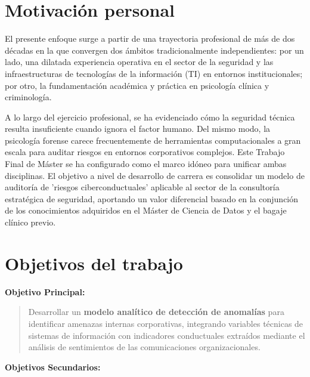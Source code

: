 \documentclass[IB]{TFUOC}%
\begin{document}
\section{Motivación personal}
El presente enfoque surge a partir de una trayectoria profesional de más de dos décadas en la que convergen dos ámbitos tradicionalmente independientes: por un lado, una dilatada experiencia operativa en el sector de la seguridad y las infraestructuras de tecnologías de la información (TI) en entornos institucionales; por otro, la fundamentación académica y práctica en psicología clínica y criminología.

\medskip
\noindent A lo largo del ejercicio profesional, se ha evidenciado cómo la seguridad técnica resulta insuficiente cuando ignora el factor humano. Del mismo modo, la psicología forense carece frecuentemente de herramientas computacionales a gran escala para auditar riesgos en entornos corporativos complejos. Este Trabajo Final de Máster se ha configurado como el marco idóneo para unificar ambas disciplinas. El objetivo a nivel de desarrollo de carrera es consolidar un modelo de auditoría de 'riesgos ciberconductuales' aplicable al sector de la consultoría estratégica de seguridad, aportando un valor diferencial basado en la conjunción de los conocimientos adquiridos en el Máster de Ciencia de Datos y el bagaje clínico previo.


\section{Objetivos del trabajo}

\textbf{Objetivo Principal:} 

\begin{quote}
Desarrollar un \textbf{modelo analítico de detección de anomalías} para identificar amenazas internas corporativas, integrando variables técnicas de sistemas de información con indicadores conductuales extraídos mediante el análisis de sentimientos de las comunicaciones organizacionales.
\end{quote}


\textbf{Objetivos Secundarios:}
\end{document}
